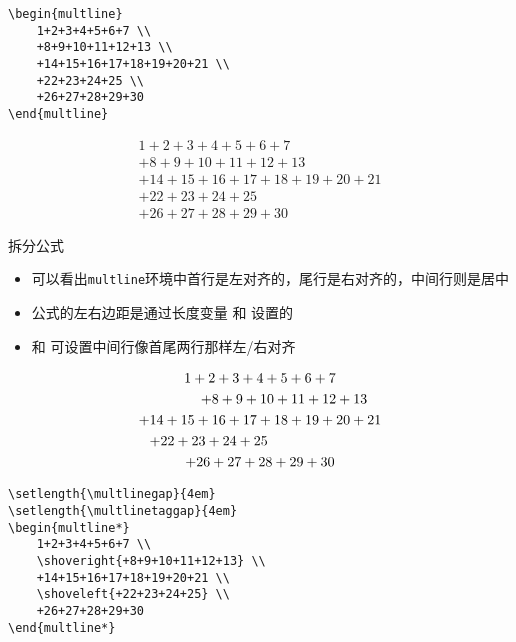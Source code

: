 \begin{frame}[fragile]
\begin{lstlisting}
\begin{multline}
    1+2+3+4+5+6+7 \\
    +8+9+10+11+12+13 \\
    +14+15+16+17+18+19+20+21 \\
    +22+23+24+25 \\
    +26+27+28+29+30
\end{multline}
\end{lstlisting}
	\clean
	\begin{multline}
		1+2+3+4+5+6+7 \\
		+8+9+10+11+12+13 \\
		+14+15+16+17+18+19+20+21 \\
		+22+23+24+25 \\
		+26+27+28+29+30
	\end{multline}
\end{frame}
\begin{frame}[fragile]{拆分公式}
	\begin{itemize}
		\item 可以看出\texttt{multline}环境中首行是左对齐的，尾行是右对齐的，中间行则是居中
		\item 公式的左右边距是通过长度变量\cprotect\fbox{\verb|\multlinegap|} 和 \cprotect\fbox{\verb|\multlinetaggap|} 设置的
		\item \cprotect\fbox{\verb|\shoveleft{}|} 和 \cprotect\fbox{\verb|\shoveright{}|} 可设置中间行像首尾两行那样左/右对齐
	\end{itemize}
	\setlength{\multlinegap}{4em}
	\setlength{\multlinetaggap}{4em}
	\begin{multline*}
		1+2+3+4+5+6+7 \\
		\shoveright{+8+9+10+11+12+13} \\
		+14+15+16+17+18+19+20+21 \\
		\shoveleft{+22+23+24+25} \\
		+26+27+28+29+30
	\end{multline*}
\end{frame}
\begin{frame}[fragile]
\begin{lstlisting}
\setlength{\multlinegap}{4em}
\setlength{\multlinetaggap}{4em}
\begin{multline*}
    1+2+3+4+5+6+7 \\
    \shoveright{+8+9+10+11+12+13} \\
    +14+15+16+17+18+19+20+21 \\
    \shoveleft{+22+23+24+25} \\
    +26+27+28+29+30
\end{multline*}
\end{lstlisting}
\end{frame}
